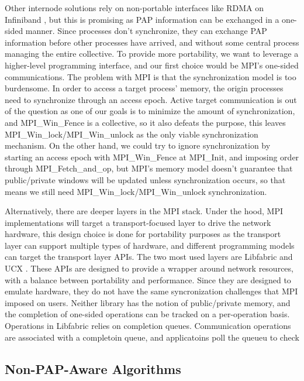 Other internode solutions rely on non-portable interfaces like RDMA on Infiniband \cite{Qian2009ProcArrivalSHMA2AIB}, but this is promising as PAP information can be exchanged in a one-sided manner.
Since processes don't synchronize, they can exchange PAP information before other processes have arrived, and without some central process managing the entire collective. 
To provide more portability, we want to leverage a higher-level programming interface, and our first choice would be MPI's one-sided communications.
The problem with MPI is that the synchronization model is too burdensome. 
In order to access a target process' memory, the origin processes need to synchronize through an access epoch. 
Active target communication is out of the question as one of our goals is to minimize the amount of synchronization, and MPI\_Win\_Fence is a collective, so it also defeats the purpose, this leaves  MPI\_Win\_lock/MPI\_Win\_unlock as the only viable synchronization mechanism.
On the other hand, we could try to ignore synchronization by starting an access epoch with MPI\_Win\_Fence at MPI\_Init, and imposing order through MPI\_Fetch\_and\_op, but MPI's memory model doesn't guarantee that public/private windows will be updated unless synchronization occurs, so that means we still need MPI\_Win\_lock/MPI\_Win\_unlock synchronization.

Alternatively, there are deeper layers in the MPI stack. 
Under the hood, MPI implementations will target a transport-focused layer to drive the network hardware, this design choice is done for portability purposes as the transport layer can support multiple types of hardware, and different programming models can target the transport layer APIs.
The two most used layers are Libfabric and UCX \cite{libfabric, shamis2015ucx}.
These APIs are designed to provide a wrapper around network resources, with a balance between portability and performance.
Since they are designed to emulate hardware, they do not have the same syncronization challenges that MPI imposed on users.  
Neither library has the notion of public/private memory, and the completion of one-sided operations can be tracked on a per-operation basis. 
Operations in Libfabric relies on completion queues.
Communication operations are associated with a completoin queue, and applicatoins poll the queueu to check 

\subsection{Non-PAP-Aware Algorithms}

